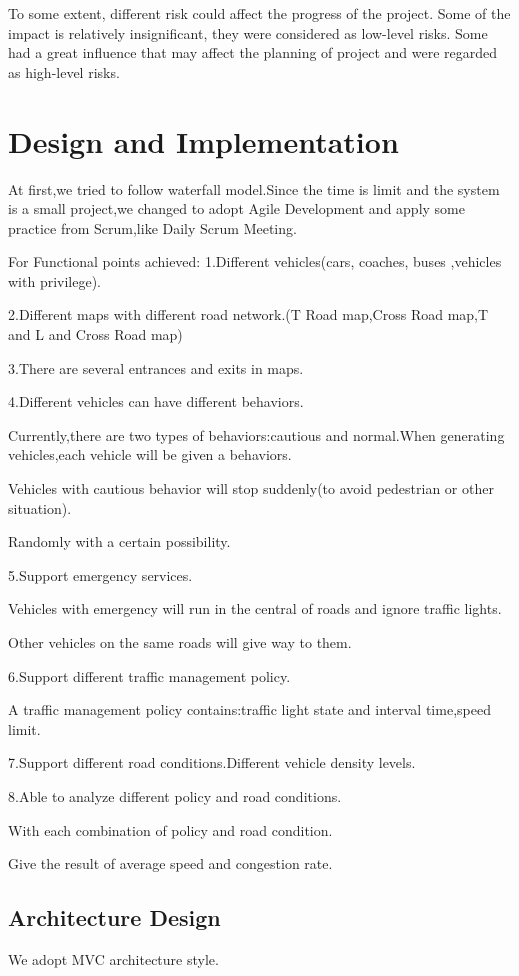 \documentclass[12pt]{amsart}
\begin{document}
To some extent, different risk could affect the progress of the project. Some of the impact is relatively insignificant, they were considered as low-level risks. Some had a great influence that may affect the planning of project and were regarded as high-level risks.

\section{Design and Implementation}

At first,we tried to follow waterfall model.Since the time is limit and the system is a small project,we changed to adopt Agile Development and apply some practice from Scrum,like Daily Scrum Meeting.

For Functional points achieved:
1.Different vehicles(cars, coaches, buses ,vehicles with privilege).

2.Different maps with different road network.(T Road map,Cross Road map,T and L and Cross Road map)

3.There are several entrances and exits in maps.

4.Different vehicles can have different behaviors.

Currently,there are two types of behaviors:cautious and normal.When generating vehicles,each vehicle will be given a behaviors.

Vehicles with cautious behavior will stop suddenly(to avoid pedestrian or other situation).

Randomly with a certain possibility.

5.Support emergency services.

Vehicles with emergency will run in the central of roads and ignore traffic lights.

Other vehicles on the same roads will give way to them.   

6.Support different traffic management policy.

A traffic management policy contains:traffic light state and interval time,speed limit.

7.Support different road conditions.Different vehicle density levels.

8.Able to analyze different policy and road conditions.

With each combination of policy and road condition.

Give the result of average speed and congestion rate.
 
\subsection{Architecture Design}
We adopt MVC architecture style.
\end{document}
